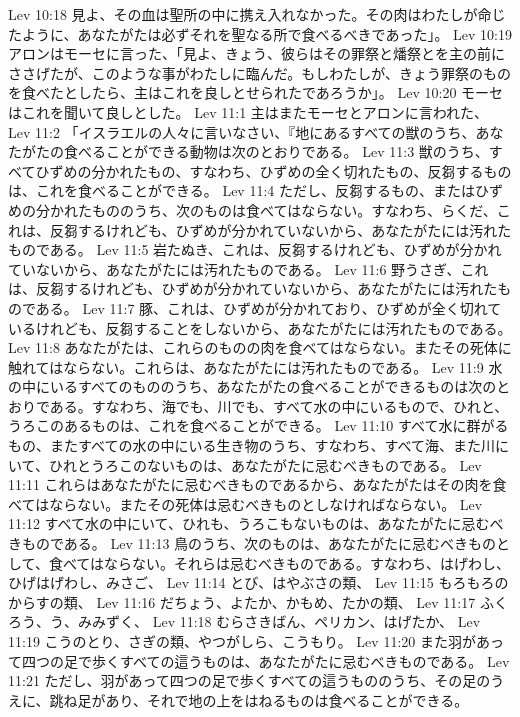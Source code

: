 Lev 10:18  見よ、その血は聖所の中に携え入れなかった。その肉はわたしが命じたように、あなたがたは必ずそれを聖なる所で食べるべきであった」。
Lev 10:19  アロンはモーセに言った、「見よ、きょう、彼らはその罪祭と燔祭とを主の前にささげたが、このような事がわたしに臨んだ。もしわたしが、きょう罪祭のものを食べたとしたら、主はこれを良しとせられたであろうか」。
Lev 10:20  モーセはこれを聞いて良しとした。
Lev 11:1  主はまたモーセとアロンに言われた、
Lev 11:2  「イスラエルの人々に言いなさい、『地にあるすべての獣のうち、あなたがたの食べることができる動物は次のとおりである。
Lev 11:3  獣のうち、すべてひずめの分かれたもの、すなわち、ひずめの全く切れたもの、反芻するものは、これを食べることができる。
Lev 11:4  ただし、反芻するもの、またはひずめの分かれたもののうち、次のものは食べてはならない。すなわち、らくだ、これは、反芻するけれども、ひずめが分かれていないから、あなたがたには汚れたものである。
Lev 11:5  岩たぬき、これは、反芻するけれども、ひずめが分かれていないから、あなたがたには汚れたものである。
Lev 11:6  野うさぎ、これは、反芻するけれども、ひずめが分かれていないから、あなたがたには汚れたものである。
Lev 11:7  豚、これは、ひずめが分かれており、ひずめが全く切れているけれども、反芻することをしないから、あなたがたには汚れたものである。
Lev 11:8  あなたがたは、これらのものの肉を食べてはならない。またその死体に触れてはならない。これらは、あなたがたには汚れたものである。
Lev 11:9  水の中にいるすべてのもののうち、あなたがたの食べることができるものは次のとおりである。すなわち、海でも、川でも、すべて水の中にいるもので、ひれと、うろこのあるものは、これを食べることができる。
Lev 11:10  すべて水に群がるもの、またすべての水の中にいる生き物のうち、すなわち、すべて海、また川にいて、ひれとうろこのないものは、あなたがたに忌むべきものである。
Lev 11:11  これらはあなたがたに忌むべきものであるから、あなたがたはその肉を食べてはならない。またその死体は忌むべきものとしなければならない。
Lev 11:12  すべて水の中にいて、ひれも、うろこもないものは、あなたがたに忌むべきものである。
Lev 11:13  鳥のうち、次のものは、あなたがたに忌むべきものとして、食べてはならない。それらは忌むべきものである。すなわち、はげわし、ひげはげわし、みさご、
Lev 11:14  とび、はやぶさの類、
Lev 11:15  もろもろのからすの類、
Lev 11:16  だちょう、よたか、かもめ、たかの類、
Lev 11:17  ふくろう、う、みみずく、
Lev 11:18  むらさきばん、ペリカン、はげたか、
Lev 11:19  こうのとり、さぎの類、やつがしら、こうもり。
Lev 11:20  また羽があって四つの足で歩くすべての這うものは、あなたがたに忌むべきものである。
Lev 11:21  ただし、羽があって四つの足で歩くすべての這うもののうち、その足のうえに、跳ね足があり、それで地の上をはねるものは食べることができる。
